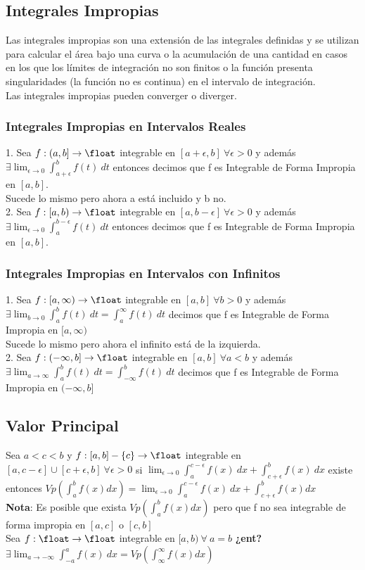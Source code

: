 \documentclass[10pt,a4paper]{article}
\begin{document}
\subsection*{Integrales Impropias}
Las integrales impropias son una extensión de las integrales definidas y se utilizan para calcular el área bajo una curva o la acumulación de una cantidad en casos en los que los límites de integración no son finitos o la función presenta singularidades (la función no es continua) en el intervalo de integración. \\
Las integrales impropias pueden converger o diverger.
\subsubsection*{Integrales Impropias en Intervalos Reales}
1. Sea $f:(a,b] \rightarrow \float$ integrable en $[a + \epsilon, b] \ \forall \epsilon > 0$ y además $\exists \lim_{\epsilon \to 0} \int^{b}_{a+\epsilon}f(t) \ dt$ entonces decimos que f es Integrable de Forma Impropia en $[a,b]$. \\
Sucede lo mismo pero ahora a está incluido y b no. \\
2. Sea $f:[a, b) \rightarrow \float$ integrable en $[a, b-\epsilon] \ \forall \epsilon > 0$ y además $\exists \lim_{\epsilon \to 0} \int^{b-\epsilon}_{a}f(t) \ dt$ entonces decimos que f es Integrable de Forma Impropia en $[a,b]$. 
\subsubsection*{Integrales Impropias en Intervalos con Infinitos}
1. Sea $f:[a, \infty) \rightarrow \float$ integrable en $[a,b] \ \forall b > 0$ y además $\exists \lim_{b \to 0} \int^{b}_{a}f(t) \ dt = \int^{\infty}_{a}f(t) \ dt$ decimos que f es Integrable de Forma Impropia en $[a, \infty)$ \\
Sucede lo mismo pero ahora el infinito está de la izquierda. \\
2. Sea $f:(-\infty, b] \rightarrow \float$ integrable en $[a,b] \ \forall a < b$ y además $\exists \lim_{a \to \infty} \int^{b}_{a}f(t) \ dt = \int^{b}_{-\infty}f(t) \ dt$ decimos que f es Integrable de Forma Impropia en $(-\infty, b]$ \\
\subsection*{Valor Principal}
Sea $a < c < b$ y $f:[a, b] - \{c\} \rightarrow \float$ integrable en $[a, c - \epsilon] \cup [c+\epsilon, b] \ \forall \epsilon > 0$ si $\lim_{\epsilon \to 0} \int^{c-\epsilon}_{a}f(x) \ dx + \int^{b}_{c+\epsilon}f(x) \ dx$ existe entonces $Vp(\int^{b}_{a}f(x) dx) = \lim_{\epsilon \to 0} \int^{c-\epsilon}_{a}f(x) \ dx + \int^{b}_{c+\epsilon}f(x) dx$ \\
\textbf{Nota}: Es posible que exista $Vp(\int^{b}_{a} f(x) dx)$ pero que f no sea integrable de forma impropia en $[a, c]$ o $[c,b]$ \\
Sea $f:\float \rightarrow \float$ integrable en $[a, b) \ \forall \ a=b$ \textbf{¿ent?} $\exists \lim_{a \to -\infty} \int^{a}_{-a}f(x) \ dx = Vp(\int^{\infty}_{\infty} f(x) dx) $
\end{document}
